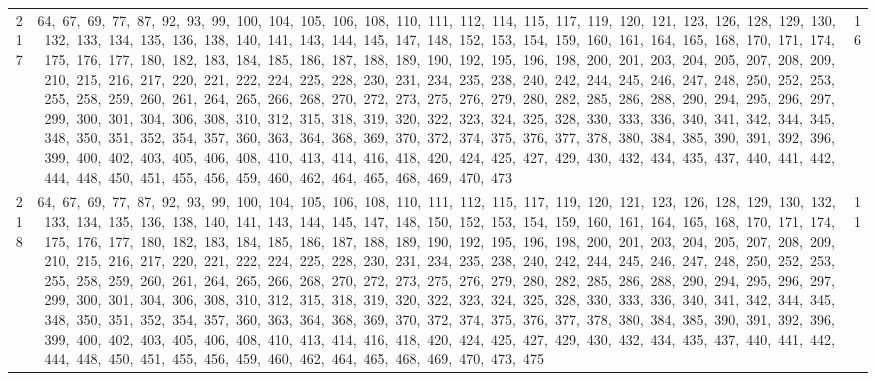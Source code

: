 \begin{longtable}{c|p{}|r}
217 & 64,\ 67,\ 69,\ 77,\ 87,\ 92,\ 93,\ 99,\ 100,\ 104,\ 105,\ 106,\ 108,\ 110,\ 111,\ 112,\ 114,\ 115,\ 117,\ 119,\ 120,\ 121,\ 123,\ 126,\ 128,\ 129,\ 130,\ 132,\ 133,\ 134,\ 135,\ 136,\ 138,\ 140,\ 141,\ 143,\ 144,\ 145,\ 147,\ 148,\ 152,\ 153,\ 154,\ 159,\ 160,\ 161,\ 164,\ 165,\ 168,\ 170,\ 171,\ 174,\ 175,\ 176,\ 177,\ 180,\ 182,\ 183,\ 184,\ 185,\ 186,\ 187,\ 188,\ 189,\ 190,\ 192,\ 195,\ 196,\ 198,\ 200,\ 201,\ 203,\ 204,\ 205,\ 207,\ 208,\ 209,\ 210,\ 215,\ 216,\ 217,\ 220,\ 221,\ 222,\ 224,\ 225,\ 228,\ 230,\ 231,\ 234,\ 235,\ 238,\ 240,\ 242,\ 244,\ 245,\ 246,\ 247,\ 248,\ 250,\ 252,\ 253,\ 255,\ 258,\ 259,\ 260,\ 261,\ 264,\ 265,\ 266,\ 268,\ 270,\ 272,\ 273,\ 275,\ 276,\ 279,\ 280,\ 282,\ 285,\ 286,\ 288,\ 290,\ 294,\ 295,\ 296,\ 297,\ 299,\ 300,\ 301,\ 304,\ 306,\ 308,\ 310,\ 312,\ 315,\ 318,\ 319,\ 320,\ 322,\ 323,\ 324,\ 325,\ 328,\ 330,\ 333,\ 336,\ 340,\ 341,\ 342,\ 344,\ 345,\ 348,\ 350,\ 351,\ 352,\ 354,\ 357,\ 360,\ 363,\ 364,\ 368,\ 369,\ 370,\ 372,\ 374,\ 375,\ 376,\ 377,\ 378,\ 380,\ 384,\ 385,\ 390,\ 391,\ 392,\ 396,\ 399,\ 400,\ 402,\ 403,\ 405,\ 406,\ 408,\ 410,\ 413,\ 414,\ 416,\ 418,\ 420,\ 424,\ 425,\ 427,\ 429,\ 430,\ 432,\ 434,\ 435,\ 437,\ 440,\ 441,\ 442,\ 444,\ 448,\ 450,\ 451,\ 455,\ 456,\ 459,\ 460,\ 462,\ 464,\ 465,\ 468,\ 469,\ 470,\ 473 & 16 \\
218 & 64,\ 67,\ 69,\ 77,\ 87,\ 92,\ 93,\ 99,\ 100,\ 104,\ 105,\ 106,\ 108,\ 110,\ 111,\ 112,\ 115,\ 117,\ 119,\ 120,\ 121,\ 123,\ 126,\ 128,\ 129,\ 130,\ 132,\ 133,\ 134,\ 135,\ 136,\ 138,\ 140,\ 141,\ 143,\ 144,\ 145,\ 147,\ 148,\ 150,\ 152,\ 153,\ 154,\ 159,\ 160,\ 161,\ 164,\ 165,\ 168,\ 170,\ 171,\ 174,\ 175,\ 176,\ 177,\ 180,\ 182,\ 183,\ 184,\ 185,\ 186,\ 187,\ 188,\ 189,\ 190,\ 192,\ 195,\ 196,\ 198,\ 200,\ 201,\ 203,\ 204,\ 205,\ 207,\ 208,\ 209,\ 210,\ 215,\ 216,\ 217,\ 220,\ 221,\ 222,\ 224,\ 225,\ 228,\ 230,\ 231,\ 234,\ 235,\ 238,\ 240,\ 242,\ 244,\ 245,\ 246,\ 247,\ 248,\ 250,\ 252,\ 253,\ 255,\ 258,\ 259,\ 260,\ 261,\ 264,\ 265,\ 266,\ 268,\ 270,\ 272,\ 273,\ 275,\ 276,\ 279,\ 280,\ 282,\ 285,\ 286,\ 288,\ 290,\ 294,\ 295,\ 296,\ 297,\ 299,\ 300,\ 301,\ 304,\ 306,\ 308,\ 310,\ 312,\ 315,\ 318,\ 319,\ 320,\ 322,\ 323,\ 324,\ 325,\ 328,\ 330,\ 333,\ 336,\ 340,\ 341,\ 342,\ 344,\ 345,\ 348,\ 350,\ 351,\ 352,\ 354,\ 357,\ 360,\ 363,\ 364,\ 368,\ 369,\ 370,\ 372,\ 374,\ 375,\ 376,\ 377,\ 378,\ 380,\ 384,\ 385,\ 390,\ 391,\ 392,\ 396,\ 399,\ 400,\ 402,\ 403,\ 405,\ 406,\ 408,\ 410,\ 413,\ 414,\ 416,\ 418,\ 420,\ 424,\ 425,\ 427,\ 429,\ 430,\ 432,\ 434,\ 435,\ 437,\ 440,\ 441,\ 442,\ 444,\ 448,\ 450,\ 451,\ 455,\ 456,\ 459,\ 460,\ 462,\ 464,\ 465,\ 468,\ 469,\ 470,\ 473,\ 475 & 11 \\

\end{longtable}
